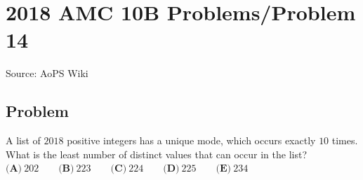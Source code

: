 \documentclass[12pt]{article}
\begin{document}
\section*{{2018 AMC 10B Problems/Problem 14}}
Source: AoPS Wiki

\subsection*{Problem}
A list of $2018$ positive integers has a unique mode, which occurs exactly $10$ times. What is the least number of distinct values that can occur in the list? $\textbf{(A)}\ 202\qquad\textbf{(B)}\ 223\qquad\textbf{(C)}\ 224\qquad\textbf{(D)}\ 225\qquad\textbf{(E)}\ 234$
\end{document}
